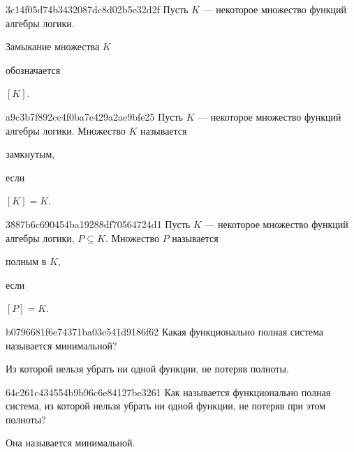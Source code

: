 \begin{note}{3c14f05d74b3432087dc8d02b5e32d2f}
    Пусть \({ K }\) --- некоторое множество функций алгебры логики.
    \begin{icloze}{2}Замыкание множества \({ K }\)\end{icloze} обозначается \begin{icloze}{1}\({ \left[ K \right] }\).\end{icloze}
\end{note}

\begin{note}{a9c3b7f892cc4f0ba7e429a2ae9bfe25}
    Пусть \({ K }\) --- некоторое множество функций алгебры логики.
    Множество \({ K }\) называется \begin{icloze}{2}замкнутым,\end{icloze} если \begin{icloze}{1}\({ [K] = K }\).\end{icloze}
\end{note}

\begin{note}{3887b6c690454ba19288df70564724d1}
    Пусть \({ K }\) --- некоторое множество функций алгебры логики, \({ P \subseteq K }\).
    Множество \({ P }\) называется \begin{icloze}{2}полным в \({ K }\),\end{icloze} если \begin{icloze}{1}\({ \left[ P \right] = K }\).\end{icloze}
\end{note}

\begin{note}{b0796681f6e74371ba03e541d9186f62}
    Какая функционально полная система называется минимальной?

    \begin{cloze}{1}
        Из которой нельзя убрать ни одной функции, не потеряв полноты.
    \end{cloze}
\end{note}

\begin{note}{64c261c434554b9b96c6e84127be3261}
    Как называется функционально полная система, из которой нельзя убрать ни одной функции, не потеряв при этом полноты?

    \begin{cloze}{1}
        Она называется минимальной.
    \end{cloze}
\end{note}

